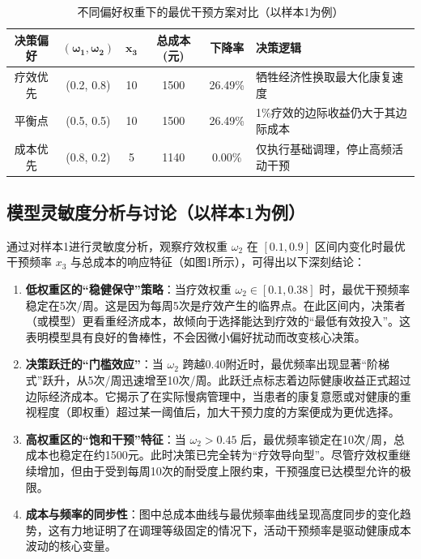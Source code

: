 \documentclass[12pt,a4paper]{article}
\begin{document}
\begin{table}[htbp]
\centering
\caption{不同偏好权重下的最优干预方案对比（以样本1为例）}
\label{tab:weight_preference}
\begin{tabular}{cccccl}
\toprule
\textbf{决策偏好} & $\boldsymbol{(\omega_1, \omega_2)}$ & $\boldsymbol{x_3}$ & \textbf{总成本(元)} & \textbf{下降率} & \textbf{决策逻辑} \\
\midrule
疗效优先 & (0.2, 0.8) & 10 & 1500 & 26.49\% & 牺牲经济性换取最大化康复速度 \\
平衡点   & (0.5, 0.5) & 10 & 1500 & 26.49\% & 1\%疗效的边际收益仍大于其边际成本 \\
成本优先 & (0.8, 0.2) & 5  & 1140 & 0.00\%  & 仅执行基础调理，停止高频活动干预 \\
\bottomrule
\end{tabular}
\end{table}

\subsection{模型灵敏度分析与讨论（以样本1为例）}
通过对样本1进行灵敏度分析，观察疗效权重 $\omega_2$ 在 $[0.1, 0.9]$ 区间内变化时最优干预频率 $x_3$ 与总成本的响应特征（如图1所示），可得出以下深刻结论：

\begin{enumerate}
    \item \textbf{低权重区的“稳健保守”策略}：当疗效权重 $\omega_2 \in [0.1, 0.38]$ 时，最优干预频率稳定在5次/周。这是因为每周5次是疗效产生的临界点。在此区间内，决策者（或模型）更看重经济成本，故倾向于选择能达到疗效的“最低有效投入”。这表明模型具有良好的鲁棒性，不会因微小偏好扰动而改变核心决策。
    
    \item \textbf{决策跃迁的“门槛效应”}：当 $\omega_2$ 跨越0.40附近时，最优频率出现显著“阶梯式”跃升，从5次/周迅速增至10次/周。此跃迁点标志着边际健康收益正式超过边际经济成本。它揭示了在实际慢病管理中，当患者的康复意愿或对健康的重视程度（即权重）超过某一阈值后，加大干预力度的方案便成为更优选择。
    
    \item \textbf{高权重区的“饱和干预”特征}：当 $\omega_2 > 0.45$ 后，最优频率锁定在10次/周，总成本也稳定在约1500元。此时决策已完全转为“疗效导向型”。尽管疗效权重继续增加，但由于受到每周10次的耐受度上限约束，干预强度已达模型允许的极限。
    
    \item \textbf{成本与频率的同步性}：图中总成本曲线与最优频率曲线呈现高度同步的变化趋势，这有力地证明了在调理等级固定的情况下，活动干预频率是驱动健康成本波动的核心变量。
\end{enumerate}
\end{document}
